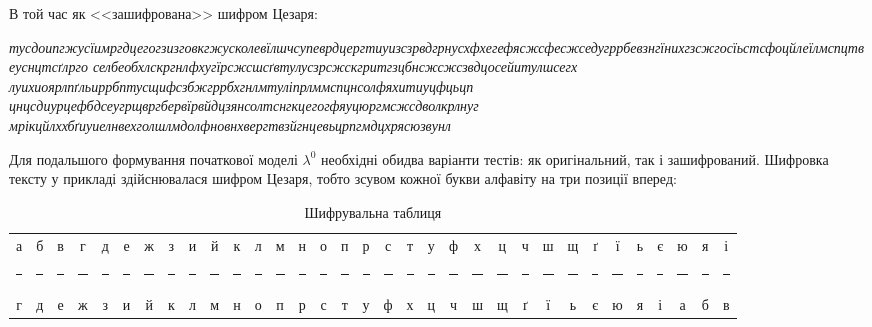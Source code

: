 \vspace{0.4cm}
В той час як <<зашифрована>> шифром Цезаря:

\vspace{0.4cm}
\begin{mdframed}[style=text box]
    \hspace{\tabsize}\textsl{
    тусдоипгжусїимргдцегогзизговкгжусколевїлшчсупеврдцергтиуизсзрвдгрну\linebreak схфхегефясжсфесжседугррбевзнгїнихгзсжгосїьстсфоцйлеїлмспцтвеуснцтсґлрго\linebreak
    селбеобхлскргнлфхугїрсжсшсґвтулусзрсжскгритгзцбнсжсжсзвдцосейитулшсегх\linebreak 
    луихиоярлпґльиррбптусщифсзбжгррбхгнлмтуліпрлммспцнсолфяхитиуцфцьцп\linebreak
    цнцсдиурцефбдсеугрщвргбервїрвйдцзянсолтснгкцегогфяуцюргмсжсдволкрлнуг\linebreak
    мрікцйлххбґиуиелнвехголшлмдолфновнхвергтвзйгнцевьцрпгмдцхрясюзвунл}
\end{mdframed}

\vspace{0.4cm}
Для подальшого формування початкової моделі $\lambda^0$ необхідні обидва варіанти тестів: як оригінальний, так і зашифрований. Шифровка тексту у прикладі здійснювалася шифром Цезаря, тобто зсувом кожної букви алфавіту на три позиції вперед:

\vspace{0.4cm}
\begin{table}[H]
    \setlength{\tabcolsep}{3.3pt}
    \renewcommand{\arraystretch}{0.5}
    \begin{center}
        \begin{tabular}{ccccccccccccccccccccccccccccccccc}
            а&б&в&г&д&е&ж&з&и&й&к&л&м&н&о&п&р&с&т&у&ф&х&ц&ч&ш&щ&ґ&ї&ь&є&ю&я&і \\
\rule[0pt]{0.8pt}{4pt} & \rule[0pt]{0.8pt}{4pt} & \rule[0pt]{0.8pt}{4pt} & \rule[0pt]{0.8pt}{4pt} & 
\rule[0pt]{0.8pt}{4pt} & \rule[0pt]{0.8pt}{4pt} & \rule[0pt]{0.8pt}{4pt} & \rule[0pt]{0.8pt}{4pt} & 
\rule[0pt]{0.8pt}{4pt} & \rule[0pt]{0.8pt}{4pt} & \rule[0pt]{0.8pt}{4pt} & \rule[0pt]{0.8pt}{4pt} & 
\rule[0pt]{0.8pt}{4pt} & \rule[0pt]{0.8pt}{4pt} & \rule[0pt]{0.8pt}{4pt} & \rule[0pt]{0.8pt}{4pt} &
\rule[0pt]{0.8pt}{4pt} & \rule[0pt]{0.8pt}{4pt} & \rule[0pt]{0.8pt}{4pt} & \rule[0pt]{0.8pt}{4pt} &
\rule[0pt]{0.8pt}{4pt} & \rule[0pt]{0.8pt}{4pt} & \rule[0pt]{0.8pt}{4pt} & \rule[0pt]{0.8pt}{4pt} &
\rule[0pt]{0.8pt}{4pt} & \rule[0pt]{0.8pt}{4pt} & \rule[0pt]{0.8pt}{4pt} & \rule[0pt]{0.8pt}{4pt} &
\rule[0pt]{0.8pt}{4pt} & \rule[0pt]{0.8pt}{4pt} & \rule[0pt]{0.8pt}{4pt} & \rule[0pt]{0.8pt}{4pt} &
\rule[0pt]{0.8pt}{4pt} \\
            г&д&е&ж&з&и&й&к&л&м&н&о&п&р&с&т&у&ф&х&ц&ч&ш&щ&ґ&ї&ь&є&ю&я&і&а&б&в \\
        \end{tabular}
    \end{center}
    \caption{Шифрувальна таблиця}
    \label{table: true cipher}
\end{table}

